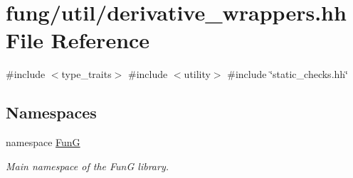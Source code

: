 \hypertarget{derivative__wrappers_8hh}{\section{fung/util/derivative\-\_\-wrappers.hh \-File \-Reference}
\label{derivative__wrappers_8hh}
}
{\ttfamily \#include $<$type\-\_\-traits$>$}\*
{\ttfamily \#include $<$utility$>$}\*
{\ttfamily \#include \char`\"{}static\-\_\-checks.\-hh\char`\"{}}\*
\subsection*{\-Namespaces}
\begin{DoxyCompactItemize}
\item 
namespace \hyperlink{namespaceFunG}{\-Fun\-G}
\begin{DoxyCompactList}\small\item\em \-Main namespace of the \-Fun\-G library. \end{DoxyCompactList}\end{DoxyCompactItemize}
